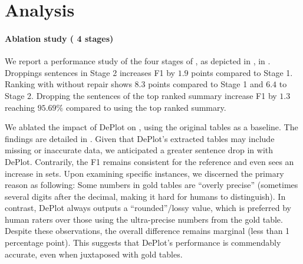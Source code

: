\section{Analysis}
\paragraph{Ablation study (\pipeline{} 4 stages)} We report a performance study of the four stages of \pipeline, as depicted in , in .
Droppings sentences in Stage 2 increases F1 by $1.9$ points compared to Stage 1.
Ranking with \metric{} without repair shows $8.3$ points compared to Stage 1 and $6.4$ to Stage 2.
Dropping the sentences of the top ranked summary increase F1 by $1.3$ reaching $95.69\%$ compared to using the top ranked summary.

\begin{table}[!ht]
\centering
{}
\caption{Binary classification F1 and AUC of \pipeline{}'s different stages, on the PALM-2 annotation set. For an overview of the stages refer to .}
\label{tab:results_stage_ablation} 
\end{table}


We ablated the impact of DePlot on \metric{}, using the original tables as a baseline. The findings are detailed in . Given that DePlot's extracted tables may include missing or inaccurate data, we anticipated a greater sentence drop in \metric{} with DePlot. Contrarily, the F1 remains consistent for the reference and even sees an increase in \pipeline{} sets. Upon examining specific instances, we discerned the primary reason as following: Some numbers in gold tables are ``overly precise'' (sometimes several digits after the decimal, making it hard for humans to distinguish). In contrast, DePlot always outputs a ``rounded''/lossy value, which is preferred by human raters over those using the ultra-precise numbers from the gold table.
Despite these observations, the overall difference remains marginal (less than 1 percentage point). This suggests that DePlot's performance is commendably accurate, even when juxtaposed with gold tables.





